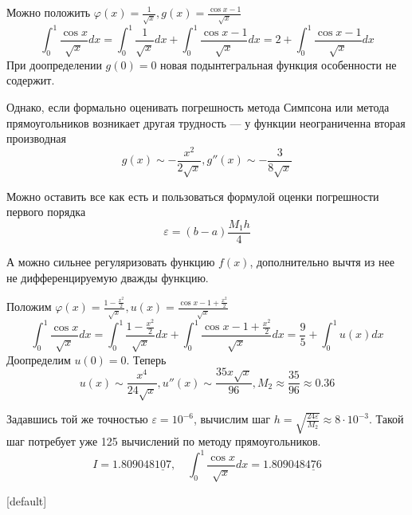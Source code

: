 \documentclass[professionalfonts,compress,unicode]{beamer}
\begin{document}
{
	Можно положить $\varphi(x) = \frac{1}{\sqrt{x}}, g(x) = \frac{\cos x - 1}{\sqrt{x}}$
	$$
	\int_0^1 \frac{\cos x}{\sqrt{x}} dx = 
	\int_0^1 \frac{1}{\sqrt{x}} dx + 
	\int_0^1 \frac{\cos x-1}{\sqrt{x}} dx = 2 + \int_0^1 \frac{\cos x-1}{\sqrt{x}} dx
	$$
	\pause
	При доопределении $g(0)=0$ новая подынтегральная функция особенности не содержит.
	\pause
	
	Однако, если формально оценивать погрешность метода Симпсона или метода прямоугольников возникает другая трудность ---
	у функции неограниченна вторая производная 
	$$g(x) \sim -\frac{x^2}{2\sqrt{x}}, g''(x) \sim -\frac{3}{8\sqrt{x}}$$
	\pause 
	
	Можно оставить все как есть и пользоваться формулой оценки погрешности первого порядка
	$$
	\varepsilon = (b-a)\frac{M_1 h}{4}
	$$
	\pause
}

{
	А можно сильнее регуляризовать функцию $f(x)$, дополнительно вычтя из нее 
	не дифференцируемую дважды функцию.

	Положим $\varphi(x) = \frac{1-\frac{x^2}{2}}{\sqrt{x}}, u(x) = \frac{\cos x - 1 + \frac{x^2}{2}}{\sqrt{x}}$
	$$
	\int_0^1 \frac{\cos x}{\sqrt{x}} dx = 
	\int_0^1 \frac{1-\frac{x^2}{2}}{\sqrt{x}} dx + 
	\int_0^1 \frac{\cos x-1+\frac{x^2}{2}}{\sqrt{x}} dx = \frac{9}{5} + \int_0^1 u(x) dx
	$$
	\pause
	Доопределим $u(0) = 0$. Теперь 
	$$u(x) \sim \frac{x^4}{24\sqrt{x}}, u''(x) \sim \frac{35x\sqrt{x}}{96}, M_2 \approx \frac{35}{96} \approx 0.36$$
	\pause
	
	Задавшись той же точностью $\varepsilon = 10^{-6}$, вычислим шаг $h = \sqrt{\frac{24\varepsilon}{M_2}} \approx 8 \cdot 10^{-3}$.
	Такой шаг потребует уже 125 вычислений по методу прямоугольников. %
	$$
	I = 1.809048\underline{107}, \quad \int_0^1 \frac{\cos x}{\sqrt{x}} dx = 1.809048\underline{476}
	$$
}
{
[default] 
}
\end{document}
